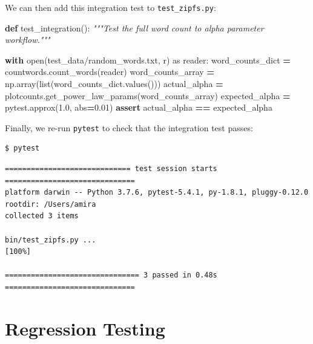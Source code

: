 \documentclass[
]{krantz}
\makeatletter
\newenvironment{Shaded}{\begin{snugshade}}{\end{snugshade}}
\newcommand{\BuiltInTok}[1]{#1}
\newcommand{\CommentTok}[1]{\textcolor[rgb]{0.56,0.35,0.01}{\textit{#1}}}
\newcommand{\ControlFlowTok}[1]{\textcolor[rgb]{0.13,0.29,0.53}{\textbf{#1}}}
\newcommand{\FloatTok}[1]{\textcolor[rgb]{0.00,0.00,0.81}{#1}}
\newcommand{\ImportTok}[1]{#1}
\newcommand{\KeywordTok}[1]{\textcolor[rgb]{0.13,0.29,0.53}{\textbf{#1}}}
\newcommand{\NormalTok}[1]{#1}
\newcommand{\OperatorTok}[1]{\textcolor[rgb]{0.81,0.36,0.00}{\textbf{#1}}}
\newcommand{\StringTok}[1]{\textcolor[rgb]{0.31,0.60,0.02}{#1}}
\newenvironment{kframe}{%
\medskip{}
\setlength{\fboxsep}{.8em}
 \def\at@end@of@kframe{}%
 \ifinner\ifhmode%
  \def\at@end@of@kframe{\end{minipage}}%
  \begin{minipage}{\columnwidth}%
 \fi\fi%
 \def\FrameCommand##1{\hskip\@totalleftmargin \hskip-\fboxsep
 \colorbox{shadecolor}{##1}\hskip-\fboxsep
     \hskip-\linewidth \hskip-\@totalleftmargin \hskip\columnwidth}%
 \MakeFramed {\advance\hsize-\width
   \@totalleftmargin\z@ \linewidth\hsize
   \@setminipage}}%
 {\par\unskip\endMakeFramed%
 \at@end@of@kframe}
\renewenvironment{Shaded}{\begin{kframe}}{\end{kframe}}
\makeatother
\begin{document}
We can then add this integration test to \texttt{test\_zipfs.py}:

\begin{Shaded}
\begin{Highlighting}[]
\KeywordTok{def}\NormalTok{ test\_integration():}
    \CommentTok{"""Test the full word count to alpha parameter workflow."""}    

    \ControlFlowTok{with} \BuiltInTok{open}\NormalTok{(}\StringTok{\textquotesingle{}test\_data/random\_words.txt\textquotesingle{}}\NormalTok{, }\StringTok{\textquotesingle{}r\textquotesingle{}}\NormalTok{) }\ImportTok{as}\NormalTok{ reader:}
\NormalTok{        word\_counts\_dict }\OperatorTok{=}\NormalTok{ countwords.count\_words(reader)}
\NormalTok{    word\_counts\_array }\OperatorTok{=}\NormalTok{ np.array(}\BuiltInTok{list}\NormalTok{(word\_counts\_dict.values()))}
\NormalTok{    actual\_alpha }\OperatorTok{=}\NormalTok{ plotcounts.get\_power\_law\_params(word\_counts\_array)}
\NormalTok{    expected\_alpha }\OperatorTok{=}\NormalTok{ pytest.approx(}\FloatTok{1.0}\NormalTok{, }\BuiltInTok{abs}\OperatorTok{=}\FloatTok{0.01}\NormalTok{)}
    \ControlFlowTok{assert}\NormalTok{ actual\_alpha }\OperatorTok{==}\NormalTok{ expected\_alpha}
\end{Highlighting}
\end{Shaded}

Finally,
we re-run \texttt{pytest} to check that the integration test passes:

\begin{verbatim}
$ pytest
\end{verbatim}

\begin{verbatim}
============================= test session starts ==============================
platform darwin -- Python 3.7.6, pytest-5.4.1, py-1.8.1, pluggy-0.12.0
rootdir: /Users/amira
collected 3 items                                                                                         

bin/test_zipfs.py ...                                                    [100%]

=============================== 3 passed in 0.48s ==============================
\end{verbatim}

\hypertarget{testing-regression}{%
\section{Regression Testing}\label{testing-regression}}
\end{document}
